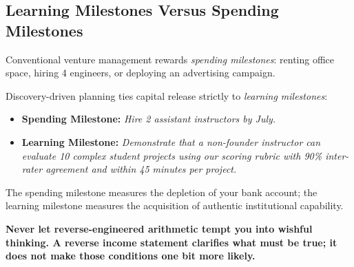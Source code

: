 \subsection{Learning Milestones Versus Spending Milestones}

Conventional venture management rewards \textit{spending milestones}: renting office space, hiring 4 engineers, or deploying an advertising campaign.

Discovery-driven planning ties capital release strictly to \textit{learning milestones}:
\begin{itemize}[leftmargin=10pt,itemsep=1pt,topsep=1pt]
  \item \textbf{Spending Milestone:} \textit{Hire 2 assistant instructors by July.}
  \item \textbf{Learning Milestone:} \textit{Demonstrate that a non-founder instructor can evaluate 10 complex student projects using our scoring rubric with 90\% inter-rater agreement and within 45 minutes per project.}
\end{itemize}

The spending milestone measures the depletion of your bank account; the learning milestone measures the acquisition of authentic institutional capability.

\textbf{Never let reverse-engineered arithmetic tempt you into wishful thinking. A reverse income statement clarifies what must be true; it does not make those conditions one bit more likely.}
